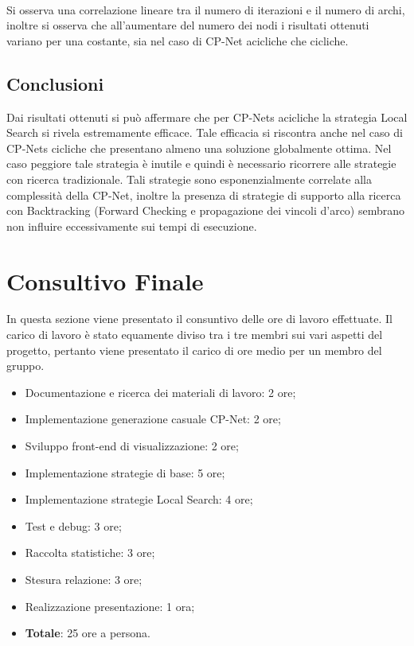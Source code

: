 \documentclass[a4paper,titlepage]{article}
\begin{document}
\\Si osserva una correlazione lineare tra il numero di iterazioni e il numero di archi, inoltre si osserva che all'aumentare del numero dei nodi i risultati ottenuti variano per una costante, sia nel caso di CP-Net acicliche che cicliche.
\subsection{Conclusioni}
Dai risultati ottenuti si può affermare che per CP-Nets acicliche la strategia Local Search si rivela estremamente efficace. Tale efficacia si riscontra anche nel caso di CP-Nets cicliche che presentano almeno una soluzione globalmente ottima. Nel caso peggiore tale strategia è inutile e quindi è necessario ricorrere alle strategie con ricerca tradizionale. Tali strategie sono esponenzialmente correlate alla complessità della CP-Net, inoltre la presenza di strategie di supporto alla ricerca con Backtracking (Forward Checking e propagazione dei vincoli d'arco) sembrano non influire eccessivamente sui tempi di esecuzione.
\section{Consultivo Finale}
In questa sezione viene presentato il consuntivo delle ore di lavoro effettuate. Il carico di lavoro è stato equamente diviso tra i tre membri sui vari aspetti del progetto, pertanto viene presentato il carico di ore medio per un membro del gruppo.
\begin{itemize}
\item Documentazione e ricerca dei materiali di lavoro: 2 ore;
\item Implementazione generazione casuale CP-Net: 2 ore;
\item Sviluppo front-end di visualizzazione: 2 ore;
\item Implementazione strategie di base: 5 ore;
\item Implementazione strategie Local Search: 4 ore;
\item Test e debug: 3 ore;
\item Raccolta statistiche: 3 ore;
\item Stesura relazione: 3 ore;
\item Realizzazione presentazione: 1 ora;
\item \textbf{Totale}: 25 ore a persona.
\end{itemize}
\end{document}
